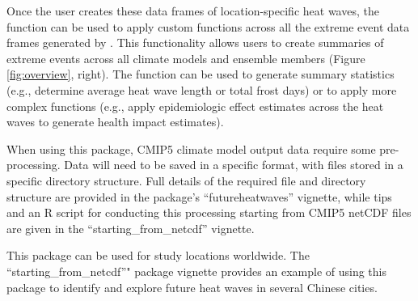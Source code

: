 Once the user creates these data frames of location-specific heat waves,
the  function can be used to apply custom
functions across all the extreme event data frames generated by
. This functionality allows users to create summaries
of extreme events across all climate models and ensemble members (Figure
\ref{fig:overview}, right). The function can be used to generate summary
statistics (e.g., determine average heat wave length or total frost
days) or to apply more complex functions (e.g., apply epidemiologic
effect estimates across the heat waves to generate health impact
estimates).

When using this package, CMIP5 climate model output data require some
pre-processing. Data will need to be saved in a specific format, with
files stored in a specific directory structure. Full details of the
required file and directory structure are provided in the package's
``futureheatwaves'' vignette, while tips and an R script for conducting
this processing starting from CMIP5 netCDF files are given in the
``starting\_from\_netcdf'' vignette.

This package can be used for study locations worldwide. The
``starting\_from\_netcdf''" package vignette provides an example of
using this package to identify and explore future heat waves in several
Chinese cities.

